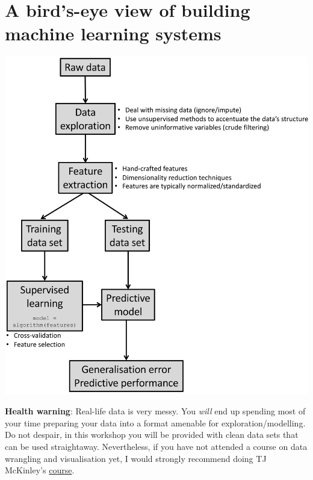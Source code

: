 \documentclass[]{book}
\begin{document}
\hypertarget{a-birds-eye-view-of-building-machine-learning-systems}{%
\section{A bird's-eye view of building machine learning systems}\label{a-birds-eye-view-of-building-machine-learning-systems}}

\begin{center}\includegraphics[width=750px]{_img//01-birdview} \end{center}

\textbf{Health warning}: Real-life data is very messy. You \emph{will} end up spending most of your time preparing your data
into a format amenable for exploration/modelling. Do not despair, in this workshop you will be provided with clean data sets
that can be used straightaway. Nevertheless, if you have not attended a course on data wrangling
and visualisation yet, I would strongly recommend doing TJ McKinley's \href{https://exeter-data-analytics.github.io/AdVis/}{course}.

\end{document}
